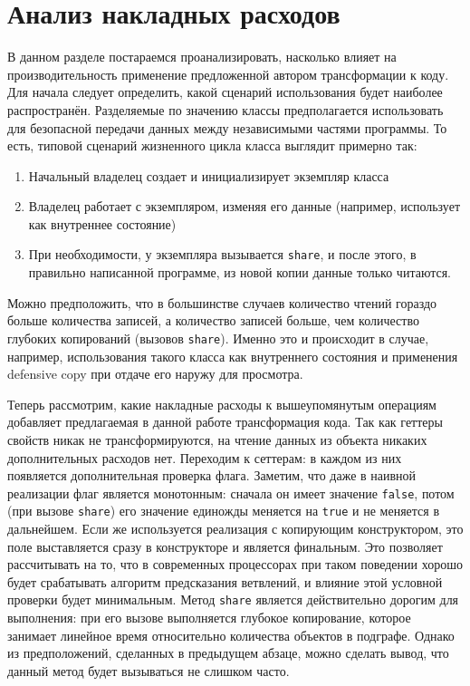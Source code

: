 \documentclass[specification,annotation,times]{itmo-student-thesis}
\begin{document}
\section{Анализ накладных расходов}

В данном разделе постараемся проанализировать, насколько влияет на производительность применение предложенной автором трансформации к коду.
Для начала следует определить, какой сценарий использования будет наиболее распространён.
Разделяемые по значению классы предполагается использовать для безопасной передачи данных между независимыми частями программы. То есть, типовой сценарий жизненного цикла класса выглядит примерно так:

\begin{enumerate}
	\item Начальный владелец создает и инициализирует экземпляр класса
	\item Владелец работает с экземпляром, изменяя его данные (например, использует как внутреннее состояние)
	\item При необходимости, у экземпляра вызывается \texttt{share}, и после этого, в правильно написанной программе, из новой копии данные только читаются.
\end{enumerate}


Можно предположить, что в большинстве случаев количество чтений гораздо больше количества записей, а количество записей больше, чем количество глубоких копирований (вызовов \texttt{share}).
Именно это и происходит в случае, например, использования такого класса как внутреннего состояния и применения defensive copy при отдаче его наружу для просмотра.

Теперь рассмотрим, какие накладные расходы к вышеупомянутым операциям добавляет предлагаемая в данной работе трансформация кода.
Так как геттеры свойств никак не трансформируются, на чтение данных из объекта никаких дополнительных расходов нет.
Переходим к сеттерам: в каждом из них появляется дополнительная проверка флага. Заметим, что даже в наивной реализации флаг является монотонным: сначала он имеет значение \texttt{false}, потом (при вызове \texttt{share}) его значение единожды меняется на \texttt{true} и не меняется в дальнейшем.
Если же используется реализация с копирующим конструктором, это поле выставляется сразу в конструкторе и является финальным.
Это позволяет рассчитывать на то, что в современных процессорах при таком поведении хорошо будет срабатывать алгоритм предсказания ветвлений, и влияние этой условной проверки будет минимальным.
Метод \texttt{share} является действительно дорогим для выполнения: при его вызове выполняется глубокое копирование, которое занимает линейное время относительно количества объектов в подграфе. Однако из предположений, сделанных в предыдущем абзаце, можно сделать вывод, что данный метод будет вызываться не слишком часто.
\end{document}
